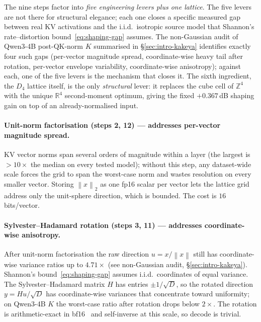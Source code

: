 \documentclass[11pt,a4paper]{article}
\theoremstyle{definition}
\theoremstyle{plain}
\newcommand{\R}{\mathbb{R}}
\newcommand{\Z}{\mathbb{Z}}
\newcommand{\norm}[1]{\left\lVert#1\right\rVert}
\begin{document}
The nine steps factor into \emph{five engineering levers plus one
lattice}. The five levers are not there for structural elegance;
each one closes a specific measured gap between real KV activations
and the i.i.d.\ isotropic source model that Shannon's
rate--distortion bound~\eqref{eq:shaping-gap} assumes. The
non-Gaussian audit of Qwen3-4B post-QK-norm $K$ summarised in
\S\ref{sec:intro-kakeya} identifies exactly four such gaps (per-vector
magnitude spread, coordinate-wise heavy tail after rotation,
per-vector envelope variability, coordinate-wise anisotropy);
against each, one of the five levers is the mechanism that closes
it. The sixth ingredient, the $D_4$ lattice itself, is the only
\emph{structural} lever: it replaces the cube cell of $\Z^4$ with
the unique $\R^4$ second-moment optimum, giving the fixed
$+0.367\,$dB shaping gain on top of an already-normalised input.

\paragraph{Unit-norm factorisation (steps 2, 12) --- addresses
per-vector magnitude spread.}
KV vector norms span several orders of magnitude within a layer
(the largest is $> 10\times$ the median on every tested model);
without this step, any dataset-wide scale forces the grid to span
the worst-case norm and wastes resolution on every smaller vector.
Storing $\norm{x}_2$ as one fp16 scalar per vector lets the
lattice grid address only the unit-sphere direction, which is
bounded. The cost is $16$ bits/vector.

\paragraph{Sylvester--Hadamard rotation (steps 3, 11) ---
addresses coordinate-wise anisotropy.}
After unit-norm factorisation the raw direction $u = x/\norm{x}$
still has coordinate-wise variance ratios up to $4.71\times$ (see
non-Gaussian audit, \S\ref{sec:intro-kakeya}). Shannon's
bound~\eqref{eq:shaping-gap} assumes i.i.d.\ coordinates of equal
variance. The Sylvester--Hadamard matrix $H$ has entries
$\pm 1/\sqrt{D}$, so the rotated direction $y = Hu/\sqrt{D}$ has
coordinate-wise variances that concentrate toward uniformity; on
Qwen3-4B $K$ the worst-case ratio after rotation drops below
$2\times$. The rotation is arithmetic-exact in bf16~\cite{quip-hash,quip-sharp}
and self-inverse at this scale, so decode is trivial.
\end{document}
